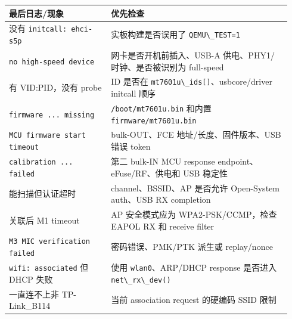 {\def\LTcaptype{none} %
\begin{longtable}[]{@{}p{0.34\linewidth}p{0.60\linewidth}@{}}
\toprule\noalign{}
最后日志/现象 & 优先检查 \\
\midrule\noalign{}
\endhead
\bottomrule\noalign{}
\endlastfoot
没有 \passthrough{\lstinline!initcall: ehci-s5p!} & 实板构建是否误用了
\passthrough{\lstinline!QEMU\_TEST=1!} \\
\passthrough{\lstinline!no high-speed device!} &
网卡是否开机前插入、USB-A 供电、PHY1/时钟、是否被识别为 full-speed \\
有 VID:PID，没有 probe & ID 是否在
\passthrough{\lstinline!mt7601u\_ids[]!}、usbcore/driver initcall
顺序 \\
\passthrough{\lstinline!firmware ... missing!} &
\passthrough{\lstinline!/boot/mt7601u.bin!} 和内置
\passthrough{\lstinline!firmware/mt7601u.bin!} \\
\passthrough{\lstinline!MCU firmware start timeout!} & bulk-OUT、FCE
地址/长度、固件版本、USB 错误 token \\
\passthrough{\lstinline!calibration ... failed!} & 第二 bulk-IN MCU
response endpoint、eFuse/RF、供电和 USB 稳定性 \\
能扫描但认证超时 & channel、BSSID、AP 是否允许 Open-System auth、USB RX
completion \\
关联后 M1 timeout & AP 安全模式应为 WPA2-PSK/CCMP，检查 EAPOL RX 和
receive filter \\
\passthrough{\lstinline!M3 MIC verification failed!} & 密码错误、PMK/PTK
派生或 replay/nonce \\
\passthrough{\lstinline!wifi: associated!} 但 DHCP 失败 & 使用
\passthrough{\lstinline!wlan0!}、ARP/DHCP response 是否进入
\passthrough{\lstinline!net\_rx\_dev()!} \\
一直连不上非 TP-Link\_B114 & 当前 association request 的硬编码 SSID
限制 \\
\end{longtable}
}
